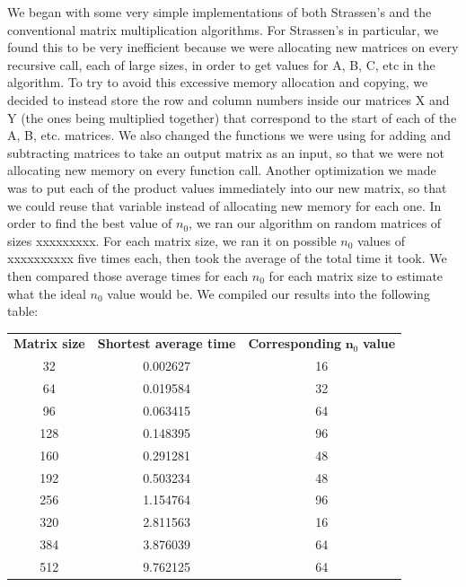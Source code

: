 \documentclass[11pt]{article}
\begin{document}
We began with some very simple implementations of both Strassen's and the conventional matrix multiplication algorithms. For Strassen's in particular, we found this to be very inefficient because we were allocating new matrices on every recursive call, each of large sizes, in order to get values for A, B, C, etc in the algorithm. To try to avoid this excessive memory allocation and copying, we decided to instead store the row and column numbers inside our matrices X and Y (the ones being multiplied together) that correspond to the start of each of the A, B, etc. matrices. We also changed the functions we were using for adding and subtracting matrices to take an output matrix as an input, so that we were not allocating new memory on every function call. Another optimization we made was to put each of the product values immediately into our new matrix, so that we could reuse that variable instead of allocating new memory for each one. 
\newline
In order to find the best value of $n_0$, we ran our algorithm on random matrices of sizes xxxxxxxxx. For each matrix size, we ran it on possible $n_0$ values of xxxxxxxxxx five times each, then took the average of the total time it took. We then compared those average times for each $n_0$ for each matrix size to estimate what the ideal $n_0$ value would be. We compiled our results into the following table:
\begin{tabular}{c | c | c}
     \textbf{Matrix size} & \textbf{Shortest average time} & \textbf{Corresponding }$\bm n_0$ \textbf{value}\\
     32  & 0.002627 & 16 \\
     64  & 0.019584 & 32 \\
     96  & 0.063415 & 64 \\
     128 & 0.148395 & 96 \\
     160 & 0.291281 & 48 \\
     192 & 0.503234 & 48 \\
     256 & 1.154764 & 96 \\
     320 & 2.811563 & 16 \\
     384 & 3.876039 & 64 \\
     512 & 9.762125 & 64
\end{tabular}
\end{document}
